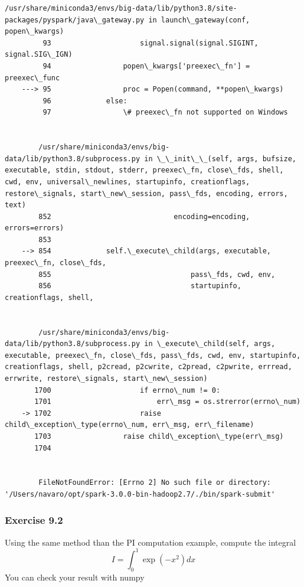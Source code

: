 \documentclass[11pt]{article}
\begin{document}
\begin{Verbatim}[commandchars=\\\{\}]
        /usr/share/miniconda3/envs/big-data/lib/python3.8/site-packages/pyspark/java\_gateway.py in launch\_gateway(conf, popen\_kwargs)
         93                     signal.signal(signal.SIGINT, signal.SIG\_IGN)
         94                 popen\_kwargs['preexec\_fn'] = preexec\_func
    ---> 95                 proc = Popen(command, **popen\_kwargs)
         96             else:
         97                 \# preexec\_fn not supported on Windows


        /usr/share/miniconda3/envs/big-data/lib/python3.8/subprocess.py in \_\_init\_\_(self, args, bufsize, executable, stdin, stdout, stderr, preexec\_fn, close\_fds, shell, cwd, env, universal\_newlines, startupinfo, creationflags, restore\_signals, start\_new\_session, pass\_fds, encoding, errors, text)
        852                             encoding=encoding, errors=errors)
        853 
    --> 854             self.\_execute\_child(args, executable, preexec\_fn, close\_fds,
        855                                 pass\_fds, cwd, env,
        856                                 startupinfo, creationflags, shell,


        /usr/share/miniconda3/envs/big-data/lib/python3.8/subprocess.py in \_execute\_child(self, args, executable, preexec\_fn, close\_fds, pass\_fds, cwd, env, startupinfo, creationflags, shell, p2cread, p2cwrite, c2pread, c2pwrite, errread, errwrite, restore\_signals, start\_new\_session)
       1700                     if errno\_num != 0:
       1701                         err\_msg = os.strerror(errno\_num)
    -> 1702                     raise child\_exception\_type(errno\_num, err\_msg, err\_filename)
       1703                 raise child\_exception\_type(err\_msg)
       1704 


        FileNotFoundError: [Errno 2] No such file or directory: '/Users/navaro/opt/spark-3.0.0-bin-hadoop2.7/./bin/spark-submit'

    \end{Verbatim}

    \subsubsection{Exercise 9.2}\label{exercise-9.2}

Using the same method than the PI computation example, compute the
integral \[
I = \int_0^1 \exp(-x^2) dx
\] You can check your result with numpy
\end{document}
